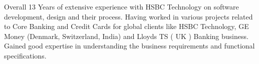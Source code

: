 

\begin{cvparagraph}

Overall 13 Years of extensive experience with HSBC Technology on software development, design and their process. Having worked in various projects related to Core Banking and Credit Cards for global clients like HSBC Technology, GE Money (Denmark, Switzerland, India) and Lloyds TS ( UK ) Banking business. Gained good expertise in understanding the business requirements and functional specifications.
\end{cvparagraph}

